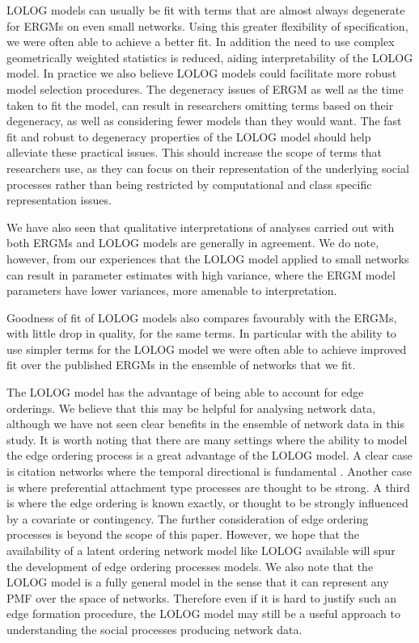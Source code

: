 \documentclass[
]{statsoc}
\begin{document}
LOLOG models can usually be fit with terms that are almost always
degenerate for ERGMs on even small networks. Using this greater
flexibility of specification, we were often able to achieve a better
fit. In addition the need to use complex geometrically weighted
statistics is reduced, aiding interpretability of the LOLOG model. In
practice we also believe LOLOG models could facilitate more robust model
selection procedures. The degeneracy issues of ERGM as well as the time
taken to fit the model, can result in researchers omitting terms based
on their degeneracy, as well as considering fewer models than they would
want. The fast fit and robust to degeneracy properties of the LOLOG
model should help alleviate these practical issues. This should increase
the scope of terms that researchers use, as they can focus on their
representation of the underlying social processes rather than being
restricted by computational and class specific representation issues.

We have also seen that qualitative interpretations of analyses carried
out with both ERGMs and LOLOG models are generally in agreement. We do
note, however, from our experiences that the LOLOG model applied to
small networks can result in parameter estimates with high variance,
where the ERGM model parameters have lower variances, more amenable to
interpretation.

Goodness of fit of LOLOG models also compares favourably with the ERGMs,
with little drop in quality, for the same terms. In particular with the
ability to use simpler terms for the LOLOG model we were often able to
achieve improved fit over the published ERGMs in the ensemble of
networks that we fit.

The LOLOG model has the advantage of being able to account for edge
orderings. We believe that this may be helpful for analysing network
data, although we have not seen clear benefits in the ensemble of
network data in this study. It is worth noting that there are many
settings where the ability to model the edge ordering process is a great
advantage of the LOLOG model. A clear case is citation networks where
the temporal directional is fundamental \citep{McLeveyetal2018}. Another
case is where preferential attachment type processes are thought to be
strong. A third is where the edge ordering is known exactly, or thought
to be strongly influenced by a covariate or contingency. The further
consideration of edge ordering processes is beyond the scope of this
paper. However, we hope that the availability of a latent ordering
network model like LOLOG available will spur the development of edge
ordering processes models. We also note that the LOLOG model is a fully
general model in the sense that it can represent any PMF over the space
of networks. Therefore even if it is hard to justify such an edge
formation procedure, the LOLOG model may still be a useful approach to
understanding the social processes producing network data.
\end{document}
